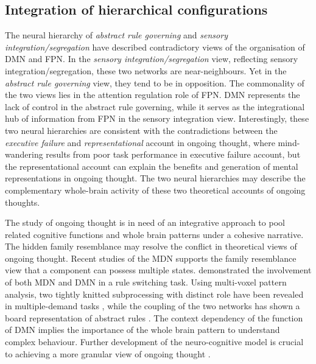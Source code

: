 \subsection{Integration of hierarchical configurations}

The neural hierarchy of \textit{abstract rule governing} and \textit{sensory integration/segregation} have described contradictory views of the organisation of DMN and FPN. In the \textit{sensory integration/segregation} view, reflecting sensory integration/segregation, these two networks are near-neighbours. Yet in the \textit{abstract rule governing} view, they tend to be in opposition.
The commonality of the two views lies in the attention regulation role of FPN. DMN represents the lack of control in the abstract rule governing, while it serves as the integrational hub of information from FPN in the sensory integration view. Interestingly, these two neural hierarchies are consistent with the contradictions between the \textit{executive failure} and \textit{representational} account in ongoing thought, where mind-wandering results from poor task performance in executive failure account, but the representational account can explain the benefits and generation of mental representations in ongoing thought. 
The two neural hierarchies may describe the complementary whole-brain activity of these two theoretical accounts of ongoing thoughts. 

The study of ongoing thought is in need of an integrative approach to pool related cognitive functions and whole brain patterns under a cohesive narrative. The hidden family resemblance may resolve the conflict in theoretical views of ongoing thought. Recent studies of the MDN supports the family resemblance view that a component can possess multiple states. %
 demonstrated the involvement of both MDN and DMN in a rule switching task. Using multi-voxel pattern analysis, two tightly knitted subprocessing with distinct role have been revealed in multiple-demand tasks \cite{Crittenden2015}, while the coupling of the two networks has shown a board representation of abstract rules \cite{Crittenden2016}. 
The context dependency of the function of DMN implies the importance of the whole brain pattern to understand complex behaviour. Further development of the neuro-cognitive model is crucial to achieving a more granular view of ongoing thought \cite{Mittner2016,SmallwoodFrontiers2013}. 

